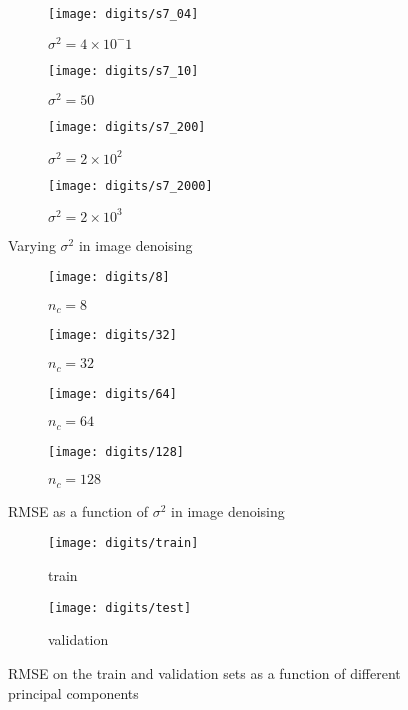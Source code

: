 \documentclass[conference,compsoc]{IEEEtran}
\begin{document}
\begin{figure*}[htb]
    \centering %
\begin{subfigure}{0.45\textwidth}
  \texttt{[image: digits/s7\_04]}
 \caption{$\sigma^2 =4 \times 10^-1$}
  \label{fig:4}
\end{subfigure}\hfil %
\begin{subfigure}{0.45\textwidth}
  \texttt{[image: digits/s7\_10]}
 \caption{$\sigma^2 =50$}
  \label{fig:5}
\end{subfigure}\hfil %
\begin{subfigure}{0.45\textwidth}
 \texttt{[image: digits/s7\_200]}
 \caption{$\sigma^2 =2 \times 10^2$}
  \label{fig:6}
\end{subfigure}
\begin{subfigure}{0.45\textwidth}
  \texttt{[image: digits/s7\_2000]}
 \caption{$\sigma^2 =2 \times 10^3$}
  \label{fig:1}
\end{subfigure}
\caption{Varying $\sigma^2$ in image denoising}
\label{fig:kpcad1}
\end{figure*}
\begin{figure*}[htb]
    \centering %

\begin{subfigure}{0.45\textwidth}
  \texttt{[image: digits/8]}
 \caption{$n_c=8$}
  \label{fig:4}
\end{subfigure}\hfil %
\begin{subfigure}{0.45\textwidth}
  \texttt{[image: digits/32]}
 \caption{$n_c=32$}
  \label{fig:5}
\end{subfigure}\hfil %
\begin{subfigure}{0.45\textwidth}
 \texttt{[image: digits/64]}
 \caption{$n_c=64$}
  \label{fig:6}
\end{subfigure}
\begin{subfigure}{0.45\textwidth}
  \texttt{[image: digits/128]}
 \caption{$n_c=128$}
  \label{fig:1}
\end{subfigure}
\caption{RMSE as a function of $\sigma^2$ in image denoising}
\label{fig:kpcad3}
\end{figure*}
\begin{figure*}[htb]
    \centering %

\begin{subfigure}{0.45\textwidth}
  \texttt{[image: digits/train]}
 \caption{train}
  \label{fig:4}
\end{subfigure}\hfil %
\begin{subfigure}{0.45\textwidth}
  \texttt{[image: digits/test]}
 \caption{validation}
  \label{fig:5}
\end{subfigure}\hfil %
\caption{RMSE on the train and validation sets as a function of different principal components}
\label{fig:kpcad5}
\end{figure*}
\end{document}
